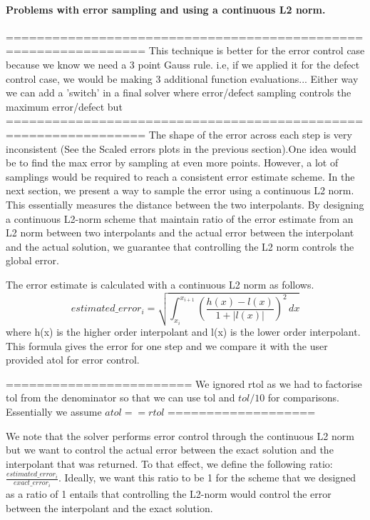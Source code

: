 \paragraph{Problems with error sampling and using a continuous L2 norm.}
================================================================
This technique is better for the error control case because we know we need a 3 point Gauss rule. i.e, if we applied it for the defect control case, we would be making 3 additional function evaluations...
Either way we can add a 'switch' in a final solver where error/defect sampling controls the maximum error/defect but 
================================================================
The shape of the error across each step is very inconsistent (See the Scaled errors plots in the previous section).One idea would be to find the max error by sampling at even more points. However, a lot of samplings would be required to reach a consistent error estimate scheme. In the next section, we present a way to sample the error using a continuous L2 norm. This essentially measures the distance between the two interpolants. By designing a continuous L2-norm scheme that maintain ratio of the error estimate from an L2 norm between two interpolants and the actual error between the interpolant and the actual solution, we guarantee that controlling the L2 norm controls the global error.

The error estimate is calculated with a continuous L2 norm as follows.
\begin{equation}
estimated\_error_i = \sqrt{ \int_{x_i}^{x_{i+1}} (\frac{h(x) - l(x)}{1 + |l(x)|})^2 \,dx }
\end{equation}
where h(x) is the higher order interpolant and l(x) is the lower order interpolant. This formula gives the error for one step and we compare it with the user provided atol for error control. 

========================
We ignored rtol as we had to factorise tol from the denominator so that we can use tol and $tol/10$ for comparisons. Essentially we assume $atol == rtol$
===================

We note that the solver performs error control through the continuous L2 norm but we want to control the actual error between the exact solution and the interpolant that was returned. To that effect, we define the following ratio: $\frac{estimated\_error_i}{exact\_error_i}$. Ideally, we want this ratio to be 1 for the scheme that we designed as a ratio of 1 entails that controlling the L2-norm would control the error between the interpolant and the exact solution.

